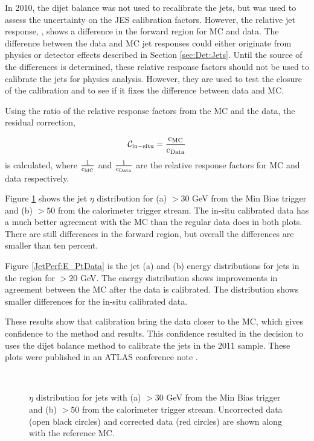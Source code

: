 In 2010, the dijet \pt{} balance was not used to recalibrate the jets, but was used to assess the uncertainty on the JES calibration factors.
However, the relative jet response, \cite{ref:EtaInter2010}, shows a difference in the forward region for MC and data.
The difference between the data and MC jet responses could either originate from physics or detector effects described in Section \ref{sec:Det:Jets}. 
Until the source of the differences is determined, these relative response factors should not be used to calibrate the jets for physics analysis.
However, they are used to test the closure of the calibration and to see if it fixes the difference between data and MC.

Using the ratio of the relative response factors from the MC and the data, the residual correction, 

\begin{equation}
\mathcal{C_{\rm{in-situ}}} = \frac{\rm{c_{MC}}}{\rm{c_{Data}}}
\label{JetPerf:ResidualCorrection}
\end{equation}
is calculated, where $\frac{1}{\rm{c_{MC}}}$ and $\frac{1}{\rm{c_{Data}}}$ are the relative response factors for MC and data respectively. 


Figure \ref{JetPerf:EtaData} shows the jet $\eta$ distribution for (a) \pt{}$>30$ GeV from the Min Bias trigger and (b) \pt{}$>50$ from the calorimeter trigger stream. 
The in-situ calibrated data has a much better agreement with the MC than the regular data does in both plots. 
There are still differences in the forward region, but overall the differences are smaller than ten percent.

Figure \ref{JetPerf:E_PtData} is the jet (a) \pt{}  and  (b) energy distributions  for jets in the region   for \pt{}$>20$ GeV. 
The energy distribution shows improvements in agreement between the MC after the data is calibrated.
The \pt{} distribution shows smaller differences for the in-situ calibrated data.

These results show that calibration bring the data closer to the MC, which gives confidence to the method and results.
This confidence resulted in the decision to uses the dijet \pt{} balance method to calibrate the jets in the 2011 sample. 
These plots were published in an ATLAS conference note \cite{ref:EtaInter2010}.


\begin{figure}
\centering
\mbox{
              \quad
              \quad
}
\caption[]{
$\eta$ distribution for jets with (a) \pt{}$>30$ GeV from the Min Bias trigger and (b) \pt{}$>50$ from the calorimeter trigger stream. 
Uncorrected data (open black circles) and corrected data (red circles) are shown along with the reference MC. 
\label{JetPerf:EtaData}}
\end{figure}

